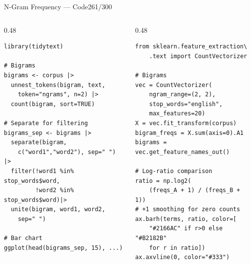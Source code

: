 \documentclass[10pt]{beamer}
\newcommand{\smark}[1]{\hfill{\scriptsize\color{codegray}#1}}
\begin{document}
\begin{frame}[fragile]{N-Gram Frequency --- Code}\smark{261/300}
\begin{columns}[T]
\begin{column}{0.48\textwidth}
\begin{lstlisting}[style=Rstyle]
library(tidytext)

# Bigrams
bigrams <- corpus |>
  unnest_tokens(bigram, text,
    token="ngrams", n=2) |>
  count(bigram, sort=TRUE)

# Separate for filtering
bigrams_sep <- bigrams |>
  separate(bigram,
    c("word1","word2"), sep=" ") |>
  filter(!word1 %in% stop_words$word,
         !word2 %in% stop_words$word)|>
  unite(bigram, word1, word2,
    sep=" ")

# Bar chart
ggplot(head(bigrams_sep, 15), ...)
\end{lstlisting}
\end{column}
\begin{column}{0.48\textwidth}
\begin{lstlisting}[style=Pystyle]
from sklearn.feature_extraction\
    .text import CountVectorizer

# Bigrams
vec = CountVectorizer(
    ngram_range=(2, 2),
    stop_words="english",
    max_features=20)
X = vec.fit_transform(corpus)
bigram_freqs = X.sum(axis=0).A1
bigrams = vec.get_feature_names_out()

# Log-ratio comparison
ratio = np.log2(
    (freqs_A + 1) / (freqs_B + 1))
# +1 smoothing for zero counts
ax.barh(terms, ratio, color=[
    "#2166AC" if r>0 else "#B2182B"
    for r in ratio])
ax.axvline(0, color="#333")
\end{lstlisting}
\end{column}
\end{columns}
\end{frame}
\end{document}
